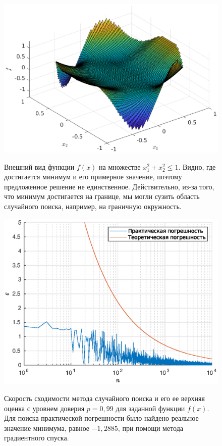 \clearpage
\begin{figure}[t]
        \noindent
        \centering
        {
                \includegraphics[width=120mm]{task_07/f_func.eps}
        }
        \caption{Внешний вид функции $f(x)$ на множестве $x_1^2 + x_2^2 \leqslant 1$. Видно, где достигается минимум и его примерное значение, поэтому предложенное решение не единственное. Действительно, из-за того, что минимум достигается на границе, мы могли сузить область случайного поиска, например, на граничную окружность.}
\end{figure}
\begin{figure}[t]
        \noindent
        \centering
        {
                \includegraphics[width=120mm]{task_07/speed.eps}
        }
        \caption{Скорость сходимости метода случайного поиска и его ее верхняя оценка с уровнем доверия $p = 0,\!99$ для заданной функции $f(x)$. Для поиска практической погрешности было найдено реальное значение минимума, равное $-1,\!2885$, при помощи метода градиентного спуска.}
\end{figure}

